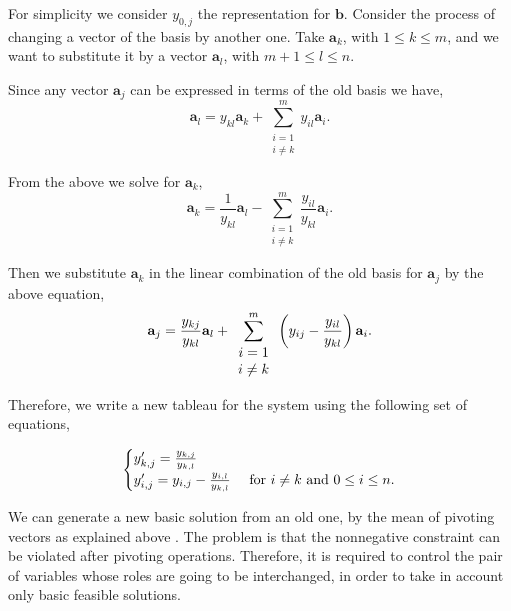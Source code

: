 For simplicity we consider $y_{0,j}$ the representation for $\mathbf{b}$. Consider the process of changing a vector of the basis by another one. Take $\mathbf{a}_k$, with $1\leq k \leq m$, and we want to substitute it by a vector $\mathbf{a}_l$, with $m+1\leq l \leq n$.

Since any vector $\mathbf{a}_j$ can be expressed in terms of the old basis we have,
\begin{equation*}
	\mathbf{a}_l = y_{kl}\mathbf{a}_k+\sum_{\begin{array}{c}
		i=1\\i\neq k
		\end{array}}^{m} y_{il}\mathbf{a}_{i}.
\end{equation*}

From the above we solve for $\mathbf{a}_k$,
\begin{equation*}
	\mathbf{a}_k=\frac{1}{y_{kl}}\mathbf{a}_l-\sum_{\begin{array}{c}i=1\\i\neq k\end{array}}^{m} \frac{y_{il}}{y_{kl}}\mathbf{a}_{i}.
\end{equation*}

Then we substitute $\mathbf{a}_{k}$ in the linear combination of the old basis for $\mathbf{a}_j$ by the above equation,
\begin{equation*}
	\mathbf{a}_j =\frac{y_{kj}}{y_{kl}}\mathbf{a}_l+\sum_{\begin{array}{c}
			i=1 \\ i\neq k
		\end{array}}^{m}\left( y_{ij}-\frac{y_{il}}{y_{kl}} \right)\mathbf{a}_i.
\end{equation*} 

Therefore, we write a new tableau for the system using the following set of equations,

\begin{equation}
	\begin{cases}
	y'_{k,j}= \frac{y_{k,j}}{y_{k,l}} & \\
	y'_{i,j}= y_{i,j}-\frac{y_{i,l}}{y_{k,l}} &  \text{ for }i\neq k \ \mathrm{and} \ 0\leq i\leq n. 
	\end{cases}
\end{equation}


We can generate a new basic solution from an old one, by the mean of pivoting vectors as explained above . The problem is that the nonnegative constraint can be violated after pivoting operations. Therefore, it is required to control the pair of variables whose roles are going to be interchanged, in order to take in account only basic feasible solutions.

